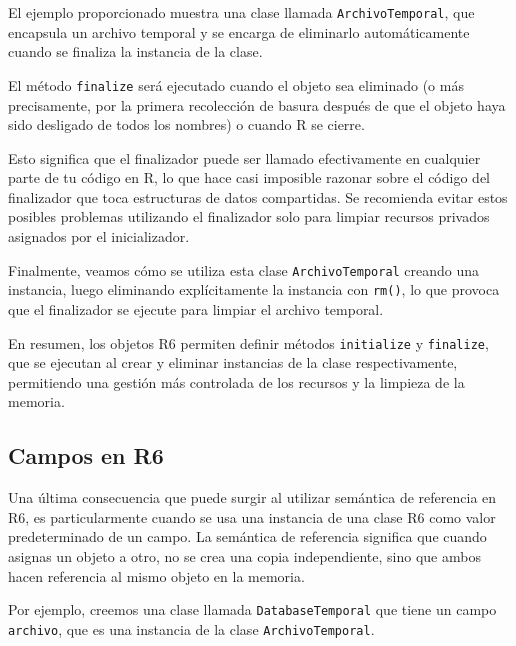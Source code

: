 \documentclass[
]{book}
\newenvironment{Shaded}{\begin{snugshade}}{\end{snugshade}}
\newcommand{\FunctionTok}[1]{\textcolor[rgb]{0.13,0.29,0.53}{\textbf{#1}}}
\newcommand{\NormalTok}[1]{#1}
\newcommand{\OtherTok}[1]{\textcolor[rgb]{0.56,0.35,0.01}{#1}}
\newcommand{\SpecialCharTok}[1]{\textcolor[rgb]{0.81,0.36,0.00}{\textbf{#1}}}
\begin{document}
El ejemplo proporcionado muestra una clase llamada \texttt{ArchivoTemporal}, que encapsula un archivo temporal y se encarga de eliminarlo automáticamente cuando se finaliza la instancia de la clase.

El método \texttt{finalize} será ejecutado cuando el objeto sea eliminado (o más precisamente, por la primera recolección de basura después de que el objeto haya sido desligado de todos los nombres) o cuando R se cierre.

Esto significa que el finalizador puede ser llamado efectivamente en cualquier parte de tu código en R, lo que hace casi imposible razonar sobre el código del finalizador que toca estructuras de datos compartidas. Se recomienda evitar estos posibles problemas utilizando el finalizador solo para limpiar recursos privados asignados por el inicializador.

Finalmente, veamos cómo se utiliza esta clase \texttt{ArchivoTemporal} creando una instancia, luego eliminando explícitamente la instancia con \texttt{rm()}, lo que provoca que el finalizador se ejecute para limpiar el archivo temporal.

\begin{Shaded}
\end{Shaded}

En resumen, los objetos R6 permiten definir métodos \texttt{initialize} y \texttt{finalize}, que se ejecutan al crear y eliminar instancias de la clase respectivamente, permitiendo una gestión más controlada de los recursos y la limpieza de la memoria.

\hypertarget{campos-en-r6}{%
\subsection{Campos en R6}\label{campos-en-r6}}

Una última consecuencia que puede surgir al utilizar semántica de referencia en R6, es particularmente cuando se usa una instancia de una clase R6 como valor predeterminado de un campo. La semántica de referencia significa que cuando asignas un objeto a otro, no se crea una copia independiente, sino que ambos hacen referencia al mismo objeto en la memoria.

Por ejemplo, creemos una clase llamada \texttt{DatabaseTemporal} que tiene un campo \texttt{archivo}, que es una instancia de la clase \texttt{ArchivoTemporal}.
\end{document}
